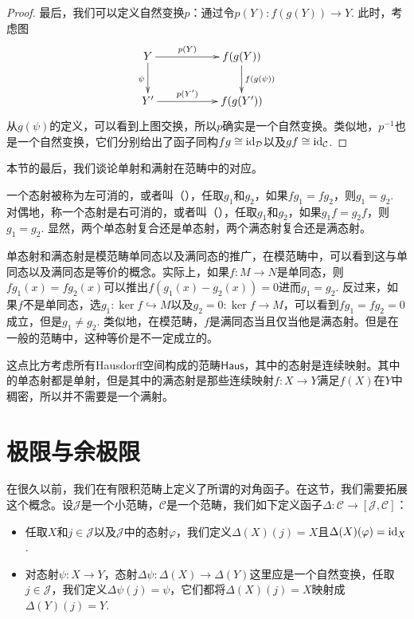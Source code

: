 \begin{proof}
最后，我们可以定义自然变换$p$：通过令$p(Y):f(g(Y))\to Y$. 此时，考虑图
\[
\begin{xy}
	\xymatrix{
		Y\ar[rr]^-{p(Y)} \ar[d]_{\psi}&&f(g(Y)) \ar[d]^{f(g(\psi))}\\
		Y'\ar[rr]^-{p(Y')}&&f(g(Y'))
	}
\end{xy}
\]
从$g(\psi)$的定义，可以看到上图交换，所以$p$确实是一个自然变换。类似地，$p^{-1}$也是一个自然变换，它们分别给出了函子同构$fg\cong \operatorname{id}_\mathcal{D}$以及$gf\cong \operatorname{id}_\mathcal{C}$.
\end{proof}

本节的最后，我们谈论单射和满射在范畴中的对应。

\begin{para}
一个态射被称为左可消的，或者叫（），任取$g_1$和$g_2$，如果$fg_1=fg_2$，则$g_1=g_2$. 对偶地，称一个态射是右可消的，或者叫（），任取$g_1$和$g_2$，如果$g_1f=g_2f$，则$g_1=g_2$. 显然，两个单态射复合还是单态射，两个满态射复合还是满态射。
\end{para}

单态射和满态射是模范畴单同态以及满同态的推广，在模范畴中，可以看到这与单同态以及满同态是等价的概念。实际上，如果$f:M\to N$是单同态，则$fg_1(x)=fg_2(x)$可以推出$f(g_1(x)-g_2(x))=0$进而$g_1=g_2$. 反过来，如果$f$不是单同态，选$g_1:\ker f\hookrightarrow M$以及$g_2=0:\ker f\to M$，可以看到$fg_1=fg_2=0$成立，但是$g_1\neq g_2$. 类似地，在模范畴，$f$是满同态当且仅当他是满态射。但是在一般的范畴中，这种等价是不一定成立的。

这点比方考虑所有Hausdorff空间构成的范畴$\mathsf{Haus}$，其中的态射是连续映射。其中的单态射都是单射，但是其中的满态射是那些连续映射$f:X\to Y$满足$f(X)$在$Y$中稠密，所以并不需要是一个满射。

\section{极限与余极限}

\para 在很久以前，我们在有限积范畴上定义了所谓的对角函子。在这节，我们需要拓展这个概念。设$\mathcal{J}$是一个小范畴，$\mathcal{C}$是一个范畴，我们如下定义函子$\Delta:\mathcal{C}\to [\mathcal{J},\mathcal{C}]$：
\begin{itemize}
\item 任取$X$和$j\in \mathcal{J}$以及$\mathcal{J}$中的态射$\varphi$，我们定义$\Delta(X)(j)=X$且$\Delta(X)(\varphi)=\operatorname{id}_X$.
\item 对态射$\psi:X\to Y$，态射$\Delta\psi:\Delta(X)\to \Delta(Y)$这里应是一个自然变换，任取$j\in \mathcal{J}$，我们定义$\Delta\psi(j)=\psi$，它们都将$\Delta(X)(j)=X$映射成$\Delta(Y)(j)=Y$.
\end{itemize}

